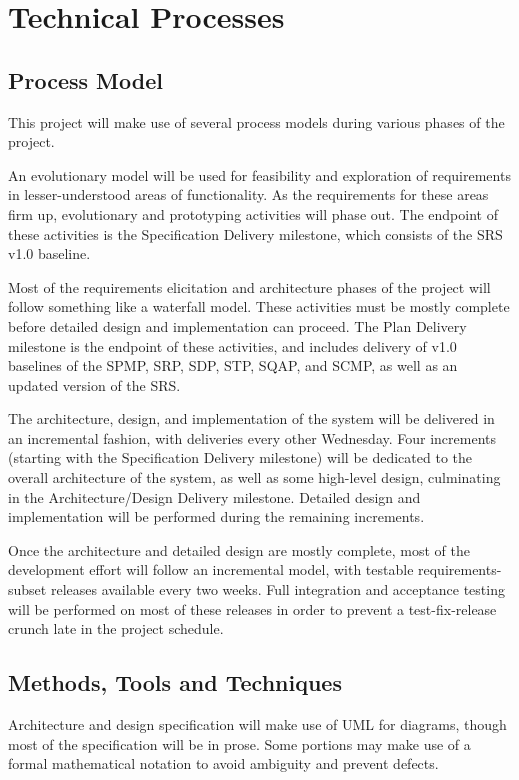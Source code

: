 \documentclass[11pt]{article}
\begin{document}
\section{Technical Processes}
\subsection{Process Model}
This project will make use of several process models during various phases of the project.

An evolutionary model will be used for feasibility and exploration of requirements in
lesser-understood areas of functionality.  As the requirements for these areas firm up, evolutionary
and prototyping activities will phase out.  The endpoint of these activities is the Specification
Delivery milestone, which consists of the SRS v1.0 baseline.

Most of the requirements elicitation and architecture phases of the project will follow something
like a waterfall model.  These activities must be mostly complete before detailed design and
implementation can proceed.  The Plan Delivery milestone is the endpoint of these activities, and
includes delivery of v1.0 baselines of the SPMP, SRP, SDP, STP, SQAP, and SCMP, as well as an
updated version of the SRS.

The architecture, design, and implementation of the system will be delivered in an incremental
fashion, with deliveries every other Wednesday.  Four increments (starting with the Specification
Delivery milestone) will be dedicated to the overall architecture of the system, as well as some
high-level design, culminating in the Architecture/Design Delivery milestone.  Detailed design and
implementation will be performed during the remaining increments.

Once the architecture and detailed design are mostly complete, most of the development effort will
follow an incremental model, with testable requirements-subset releases available every two weeks.
Full integration and acceptance testing will be performed on most of these releases in order to
prevent a test-fix-release crunch late in the project schedule.



\subsection{Methods, Tools and Techniques}
Architecture and design specification will make use of UML for diagrams, though most of the
specification will be in prose.  Some portions may make use of a formal mathematical notation to
avoid ambiguity and prevent defects.
\end{document}
